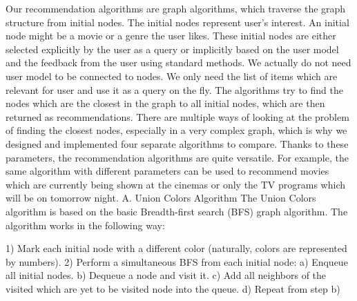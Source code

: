 \documentclass[10pt,slovak,a4paper]{article}
\begin{document}
\begin{multicols}{2}
  Our recommendation algorithms are graph algorithms, which traverse the graph structure from initial nodes. The initial nodes represent user’s interest. An initial node might be a movie or a genre the user likes. These initial nodes are either selected explicitly by the user as a query or implicitly based on the user model and the feedback from the user using standard methods. We actually do not need user model to be connected to nodes. We only need the list of items which are relevant for user and use it as a query on the fly.
The algorithms try to find the nodes which are the closest in the graph to all initial nodes, which are then returned as recommendations. There are multiple ways of looking at the problem of finding the closest nodes, especially in a very complex graph, which is why we designed and implemented four separate algorithms to compare.
Thanks to these parameters, the recommendation algorithms are quite versatile. For example, the same algorithm with different parameters can be used to recommend movies which are currently being shown at the cinemas or only the TV programs which will be on tomorrow night.
 A. Union Colors Algorithm
The Union Colors algorithm is based on the basic Breadth-first search (BFS) graph algorithm. The algorithm works in the following way:

 1)	Mark each initial node with a different color (naturally, colors are represented by numbers).
 2)	Perform a simultaneous BFS from each initial node:
 a)	Enqueue all initial nodes.
 b)	Dequeue a node and visit it.
 c)	Add all neighbors of the visited which are yet
to be visited node into the queue.
 d)	Repeat from step b)




\end{multicols}
\end{document}
